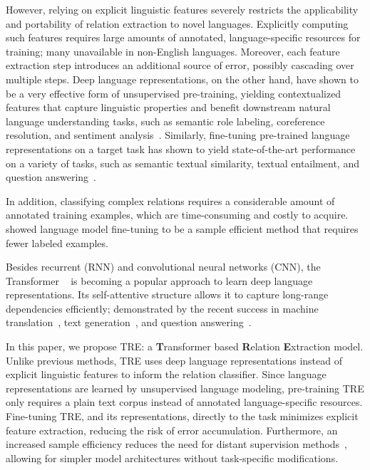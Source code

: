 \documentclass[akbc,twoside,11pt]{article}
\begin{document}
However, relying on explicit linguistic features severely restricts the applicability and portability of relation extraction to novel languages. Explicitly computing such features requires large amounts of annotated, language-specific resources for training; many unavailable in non-English languages. Moreover, each feature extraction step introduces an additional source of error, possibly cascading over multiple steps.
Deep language representations, on the other hand, have shown to be a very effective form of unsupervised pre-training, yielding contextualized features that capture linguistic properties and benefit downstream natural language understanding tasks, such as semantic role labeling, coreference resolution, and sentiment analysis~\cite{peters_deepcw_2018}. Similarly, fine-tuning pre-trained language representations on a target task has shown to yield state-of-the-art performance on a variety of tasks, such as semantic textual similarity, textual entailment, and question answering~\cite{radford_improvinglu_2018}.

In addition, classifying complex relations requires a considerable amount of annotated training examples, which are time-consuming and costly to acquire. \citet{ruder_universallm_2018} showed language model fine-tuning to be a sample efficient method that requires fewer labeled examples. 

Besides recurrent (RNN) and convolutional neural networks (CNN), the Transformer ~\cite{vaswani_attention_2017} is becoming a popular approach to learn deep language representations. Its self-attentive structure allows it to capture long-range dependencies efficiently; demonstrated by the recent success in machine translation~\cite{vaswani_attention_2017}, text generation~\cite{liu_generatingwb_2018}, and question answering~\cite{radford_improvinglu_2018}.

In this paper, we propose TRE: a \textbf{T}ransformer based \textbf{R}elation \textbf{E}xtraction model. Unlike previous methods, TRE uses deep language representations instead of explicit linguistic features to inform the relation classifier. Since language representations are learned by unsupervised language modeling, pre-training TRE only requires a plain text corpus instead of annotated language-specific resources. Fine-tuning TRE, and its representations, directly to the task minimizes explicit feature extraction, reducing the risk of error accumulation. Furthermore, an increased sample efficiency reduces the need for distant supervision methods~\cite{mintz_distantsf_2009, riedel_modeling_2010}, allowing for simpler model architectures without task-specific modifications.
\end{document}
